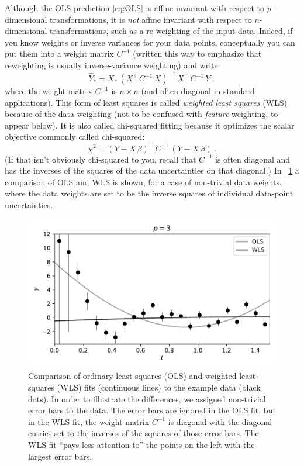 \documentclass[12pt,letterpaper]{article}
\newlength{\figurewidth}
\begin{document}
Although the OLS prediction \eqref{eq:OLS} is affine invariant with respect to $p$-dimensional transformations, it is \emph{not} affine invariant with respect to $n$-dimensional transformations, such as a re-weighting of the input data. Indeed, if you know weights or inverse variances for your data points, conceptually you can put them into a weight matrix $C^{-1}$ (written this way to emphasize that reweighting is usually inverse-variance weighting) and write
\begin{equation}
    \hat{Y}_\ast = X_\ast\,(X^\top\,C^{-1}\,X)^{-1}\,X^\top\,C^{-1}\,Y
    ~,
\end{equation}
where the weight matrix $C^{-1}$ is $n\times n$ (and often diagonal in standard applications). This form of least squares is called \emph{weighted least squares} (WLS) because of the data weighting (not to be confused with \emph{feature} weighting, to appear below).
It is also called chi-squared fitting because it optimizes the scalar objective commonly called chi-squared:
\begin{equation}
    \chi^2 = (Y - X\,\beta)^\top\,C^{-1}\,(Y - X\,\beta)
    ~.
\end{equation}
(If that isn't obviously chi-squared to you, recall that $C^{-1}$ is often diagonal and has the inverses of the squares of the data uncertainties on that diagonal.)
In \figurename~\ref{fig:wls} a comparison of OLS and WLS is shown, for a case of non-trivial data weights, where the data weights are set to be the inverse squares of individual data-point uncertainties.
\begin{figure}[t]
    \begin{mdframed}
    \includegraphics[width=\figurewidth]{paper/WLS.pdf}
    \caption{Comparison of ordinary least-squares (OLS) and weighted least-squares (WLS) fits (continuous lines) to the example data (black dots). In order to illustrate the differences, we assigned non-trivial error bars to the data. The error bars are ignored in the OLS fit, but in the WLS fit, the weight matrix $C^{-1}$ is diagonal with the diagonal entries set to the inverses of the squares of those error bars. The WLS fit ``pays less attention to'' the points on the left with the largest error bars.}
    \label{fig:wls}
    \end{mdframed}
\end{figure}
\end{document}
